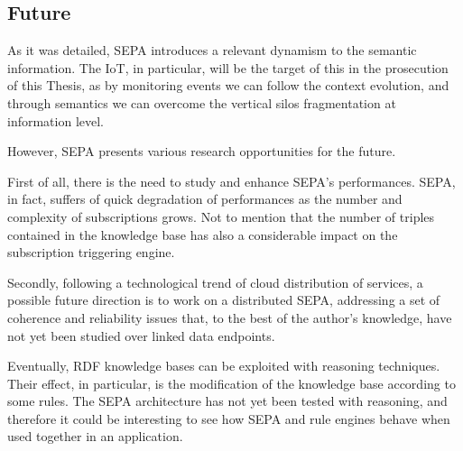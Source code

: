 \subsection{Future}
As it was detailed, SEPA introduces a relevant dynamism to the semantic information. The IoT, in particular, will be the target of this in the prosecution of this Thesis, as by monitoring events we can follow the context evolution, and through semantics we can overcome the vertical silos fragmentation at information level.

However, SEPA presents various research opportunities for the future.

First of all, there is the need to study and enhance SEPA’s performances. SEPA, in fact, suffers of quick degradation of performances as the
number and complexity of subscriptions grows. Not to mention that the number of triples contained in the knowledge base has also a considerable impact on the subscription triggering engine. 

Secondly, following a technological trend of cloud distribution of services, a possible future direction is to work on a distributed SEPA, addressing a set of coherence and reliability issues that, to the best of the author's knowledge, have not yet been studied over linked data endpoints.

Eventually, RDF knowledge bases can be exploited with reasoning techniques. Their effect, in particular, is the modification of the knowledge base according to some rules. The SEPA architecture has not yet been tested with
reasoning, and therefore it could be interesting to see how SEPA and rule engines behave when used together in an application.